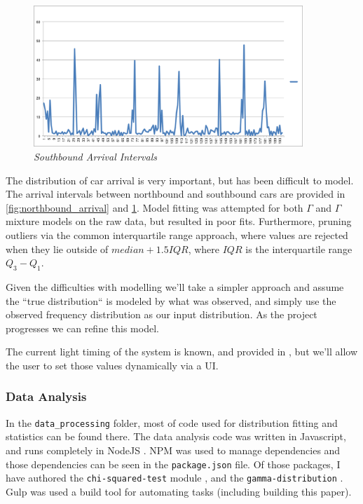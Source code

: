 \documentclass[a4paper,12pt]{article}
\begin{document}
\begin{figure}  
\begin{center}
\includegraphics[width=4in]{../southbound.png}  
\caption{\small \sl Southbound Arrival Intervals \label{fig:southbound_arrival}}  
\end{center}  
\end{figure} 

The distribution of car arrival is very important, but has been difficult to model. The arrival intervals between 
northbound and southbound cars are provided in \ref{fig:northbound_arrival} and \ref{fig:southbound_arrival}.
Model fitting was attempted for both $\Gamma$ and $\Gamma$ mixture models on the raw data, but resulted in poor
fits. Furthermore, pruning outliers via the common interquartile range approach, where values are rejected when
they lie outside of $median + 1.5IQR$, where $IQR$ is the interquartile range $Q_3 - Q_1$.

Given the difficulties with modelling we'll take a simpler approach and assume the ``true distribution`` is modeled by what was observed,
and simply use the observed frequency distribution as our input distribution. As the project progresses we can
refine this model.

The current light timing of the system is known, and provided in \cite{ngsim}, but we'll allow the user to set
those values dynamically via a UI.

\subsubsection{Data Analysis}
In the \texttt{data\_processing} folder, most of code used for distribution fitting and statistics can be found there.
The data analysis code was written in Javascript, and runs completely in NodeJS \cite{nodejs}. NPM \cite{npm} was used
to manage dependencies and those dependencies can be seen in the \texttt{package.json} file. Of those packages, I have
authored the \texttt{chi-squared-test} module \cite{chiSquaredNpm}, and the \texttt{gamma-distribution}
\cite{gammaDistributionNpm}. Gulp \cite{gulp} was used a build tool for automating tasks (including building this paper).
\end{document}
